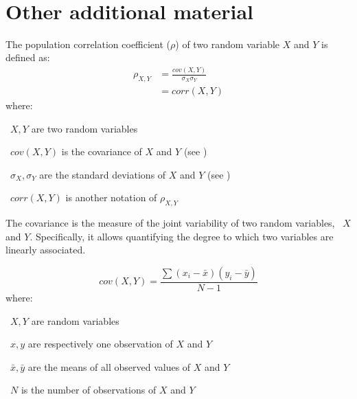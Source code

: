 \FloatBarrier\
\section{Other additional material}


The population correlation coefficient ($\rho$) of two random variable $X$ and $Y$
is defined as:
\begin{equation}\label{eq:PearsonPopCor}
     \tag{Population correlation coefficient}
     \begin{split}
         \rho_{X,Y} & = \frac{cov(X,Y)}{\sigma_X \sigma_Y}\\
                    & = corr(X,Y)
     \end{split}
\end{equation}
where:
\quad\begin{eqlist}[\setlength{\itemsep}{0em}%
            \setlength{\topsep}{0em}%
            \setlength{\partopsep}{0em}%
            \setlength{\parskip}{0em}%
            \setlength{\parsep}{0em}]
    \item[\textbullet\ $X,Y$] are two random variables
    \item[\textbullet\ $cov(X,Y)$] is the covariance of $X$ and $Y$
        (see \Cref{eq:covariance})
    \item[\textbullet\ $\sigma_{X},\sigma_{Y}$] are the standard deviations
        of $X$ and $Y$ (see \Cref{eq:sd})
    \item[\textbullet\ $corr(X,Y)$] is another notation of $\rho_{X,Y}$
\end{eqlist}

The covariance is the measure of the joint variability of two random variables,
\eg\ $X$ and $Y$.
Specifically, it allows quantifying the degree to which
two variables are linearly associated.

\begin{equation}
    \tag{Covariance}\label{eq:covariance}
        cov(X,Y) =  \frac{\sum{(x_{i}-\bar{x})(y_{i}-\bar{y})}}{N-1}
\end{equation}
where:
\quad\begin{eqlist}[\setlength{\itemsep}{0em}%
            \setlength{\topsep}{0em}%
            \setlength{\partopsep}{0em}%
            \setlength{\parskip}{0em}%
            \setlength{\parsep}{0em}]
       \item[\textbullet\ $X,Y$] are random variables
       \item[\textbullet\ $x,y$] are respectively one observation of $X$ and $Y$
       \item[\textbullet\ $\bar{x},\bar{y}$] are the means
           of all observed values of $X$ and $Y$
       \item[\textbullet\ $N$] is the number of observations of $X$ and $Y$
\end{eqlist}

